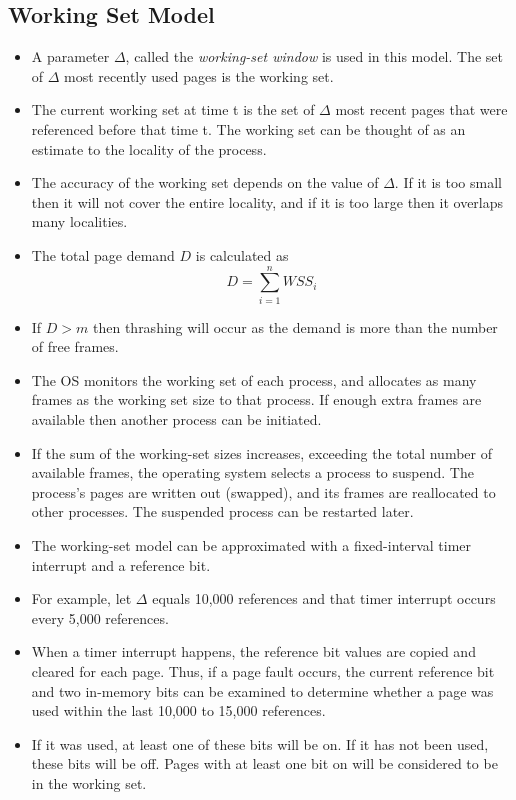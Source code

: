 \documentclass{article}
\theoremstyle{plain}
\theoremstyle{definition}
\begin{document}
\subsection{Working Set Model}
\begin{itemize}
    \item A parameter $\Delta$, called the \textit{working-set window} is used in this model. The set of $\Delta$ most recently used pages is the working set. 
    
    \item The current working set at time t is the set of $\Delta$ most recent pages that were referenced before that time t. The working set can be thought of as an estimate to the locality of the process.
    
    \item The accuracy of the working set depends on the value of $\Delta$. If it is too small then it will not cover the entire locality, and if it is too large then it overlaps many localities. 
    
    \item The total page demand $D$ is calculated as 
    \begin{equation*}
        D = \sum_{i=1}^{n} WSS_i
    \end{equation*}
    
    \item If $D>m$ then thrashing will occur as the demand is more than the number of free frames. 
    
    \item The OS monitors the working set of each process, and allocates as many frames as the working set size to that process. If enough extra frames are available then another process can be initiated. 
    
    \item If the sum of the working-set sizes increases, exceeding the total number of available frames, the operating system selects a process to suspend. The process’s pages are written out (swapped), and its frames are reallocated to other processes. The suspended process can be restarted later.
    
    \item The working-set model can be approximated with a fixed-interval timer interrupt and a reference bit. 
    
    \item For example, let $\Delta$ equals 10,000 references and that timer interrupt occurs every 5,000 references. 
    
    \item When a timer interrupt happens, the reference bit values are copied and cleared for each page. Thus, if a page fault occurs, the current reference bit and two in-memory bits can be examined to determine whether a page was used within the last 10,000 to 15,000 references. 
    \item If it was used, at least one of these bits will be on. If it has not been used, these bits will be off. Pages with at least one bit on will be considered to be in the working set.
\end{itemize}
\end{document}

